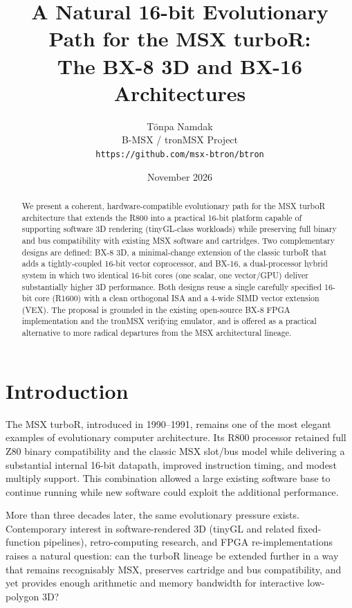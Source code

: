 \documentclass[11pt,a4paper]{article}
\title{
A Natural 16-bit Evolutionary Path for the MSX turboR:\\
The BX-8 3D and BX-16 Architectures
}
\author{
T\"onpa Namdak\\
B-MSX / tronMSX Project\\
\texttt{https://github.com/msx-btron/btron}
}
\date{November 2026}
\begin{document}
\maketitle

\begin{abstract}
We present a coherent, hardware-compatible evolutionary path for the MSX turboR architecture that extends the R800 into a practical 16-bit platform capable of supporting software 3D rendering (tinyGL-class workloads) while preserving full binary and bus compatibility with existing MSX software and cartridges. Two complementary designs are defined: BX-8 3D, a minimal-change extension of the classic turboR that adds a tightly-coupled 16-bit vector coprocessor, and BX-16, a dual-processor hybrid system in which two identical 16-bit cores (one scalar, one vector/GPU) deliver substantially higher 3D performance. Both designs reuse a single carefully specified 16-bit core (R1600) with a clean orthogonal ISA and a 4-wide SIMD vector extension (VEX). The proposal is grounded in the existing open-source BX-8 FPGA implementation and the tronMSX verifying emulator, and is offered as a practical alternative to more radical departures from the MSX architectural lineage.
\end{abstract}

\tableofcontents
\newpage

\section{Introduction}

The MSX turboR, introduced in 1990--1991, remains one of the most elegant examples of evolutionary computer architecture. Its R800 processor retained full Z80 binary compatibility and the classic MSX slot/bus model while delivering a substantial internal 16-bit datapath, improved instruction timing, and modest multiply support. This combination allowed a large existing software base to continue running while new software could exploit the additional performance.

More than three decades later, the same evolutionary pressure exists. Contemporary interest in software-rendered 3D (tinyGL and related fixed-function pipelines), retro-computing research, and FPGA re-implementations raises a natural question: can the turboR lineage be extended further in a way that remains recognisably MSX, preserves cartridge and bus compatibility, and yet provides enough arithmetic and memory bandwidth for interactive low-polygon 3D?
\end{document}
